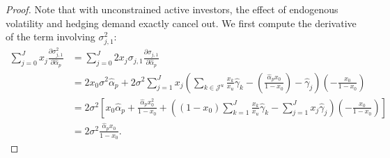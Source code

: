 \begin{proof}
	Note that with unconstrained active investors, the effect of endogenous volatility and hedging demand exactly cancel out.
	We first compute the derivative of the term involving $\sigma_{j,1}^2$:
	\begin{align}
		\sum_{j=0}^J x_j   \frac{\partial \sigma_{j,1}^2}{\partial \hat{\alpha}_p} &= \sum_{j=0}^J 2x_j  \sigma_{j,1} \frac{\partial \sigma_{j,1}}{\partial \hat{\alpha}_p} \nonumber\\
		&= 2 x_0  \sigma^2 \hat{\alpha}_p  + 2 \sigma^2 \sum_{j=1}^J x_j \left( \sum_{k\in\mathcal{J}^u} \frac{x_k}{x_u} \hat{\gamma}_k -\left(\frac{\hat{\alpha}_p  x_0}{1-x_0}\right)- \hat{\gamma}_j\right) \left( -\frac{x_0}{1-x_0}\right) \nonumber \\
		&= 2 \sigma^2 \left[ x_0 \hat{\alpha}_p + \frac{\hat{\alpha}_p x_0^2}{1-x_0}+ \left((1-x_0) \sum_{k=1}^J \frac{x_k}{x_u} \hat{\gamma}_k - \sum_{j=1}^J x_j\hat{\gamma}_j\right) \left( -\frac{x_0}{1-x_0}\right)\right] \nonumber \\
		&= 2 \sigma^2 \frac{\hat{\alpha}_p x_0}{1-x_0}.
	\end{align}
	

\end{proof}
